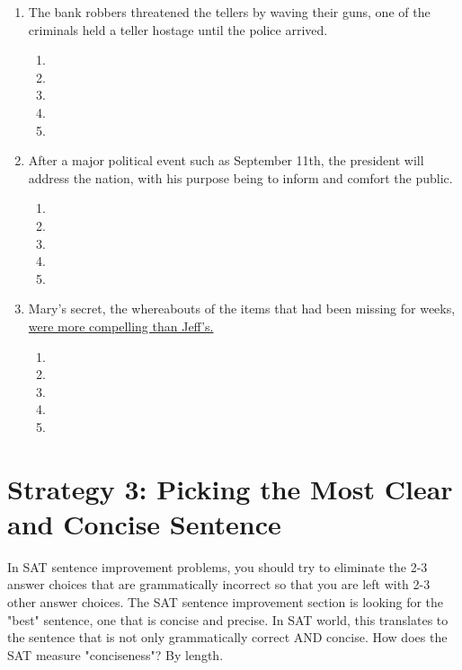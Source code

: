 \documentclass[12pt]{book}
\begin{document}
\begin{enumerate}
\begin{enumerate}
\bigskip
\item The bank robbers threatened the tellers by waving their guns, one of the criminals held a teller hostage until the police arrived. 
\bigskip
\begin{enumerate}[label=(\Alph*)]

\item        \hrulefill
\item   \hrulefill
\item    \hrulefill
\item    \hrulefill
\item   \hrulefill
\end{enumerate}

\bigskip
\item After a major political event such as September 11th, the president will address the nation, with his purpose being to inform and comfort the public.

\bigskip
\begin{enumerate}[label=(\Alph*)]

\item        \hrulefill
\item   \hrulefill
\item    \hrulefill
\item    \hrulefill
\item   \hrulefill
\end{enumerate}

\bigskip
\item Mary's secret, the whereabouts of the items that had been missing for weeks, \ul{were more compelling than Jeff's.}

\bigskip
\begin{enumerate}[label=(\Alph*)]

\item        \hrulefill
\item   \hrulefill
\item    \hrulefill
\item    \hrulefill
\item   \hrulefill
\end{enumerate}


\end{enumerate}

\newpage
\section{Strategy 3: Picking the Most Clear and Concise Sentence}
In SAT sentence improvement problems, you should try to eliminate the 2-3 answer choices that are grammatically incorrect so that you are left with 2-3 other answer choices. The SAT sentence improvement section is looking for the "best" sentence, one that is concise and precise. In SAT world, this translates to the sentence that is not only grammatically correct AND concise. How does the SAT measure "conciseness"? By length. \\


\end{enumerate}
\end{document}
